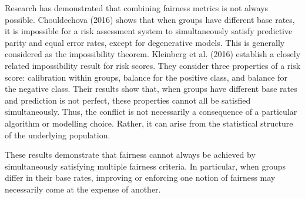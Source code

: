Research has demonstrated that combining fairness metrics is not always possible. Chouldechova (2016) \cite{chouldechova2016} shows that when groups have different base rates, it is impossible for a risk assessment system to simultaneously satisfy predictive parity and equal error rates, except for degenerative models. This is generally considered as the impossibility theorem.
Kleinberg et al. (2016) \cite{Kleinberg2016} establish a closely related impossibility result for risk scores. They consider three properties of a risk score: calibration within groups, balance for the positive class, and balance for the negative class. Their results show that, when groups have different base rates and prediction is not perfect, these properties cannot all be satisfied simultaneously. Thus, the conflict is not necessarily a consequence of a particular algorithm or modelling choice. Rather, it can arise from the statistical structure of the underlying population.

These results demonstrate that fairness cannot always be achieved by simultaneously satisfying multiple fairness criteria. In particular, when groups differ in their base rates, improving or enforcing one notion of fairness may necessarily come at the expense of another.
